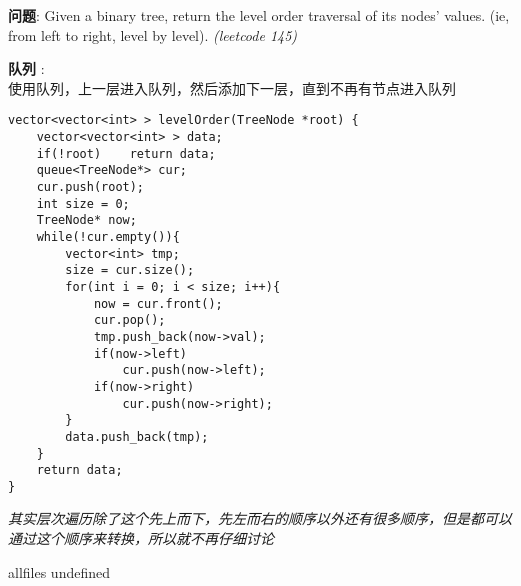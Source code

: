 \documentclass{article}
\begin{document}
\begin{CJK}{UTF8}{gbsn}     %

\else
    
\begin{description}
    \item{\textbf{问题}}: Given a binary tree, return the level order traversal of its nodes' values. (ie, from left to right, level by level). \textit{(leetcode 145)}
    \item{\textbf{队列}} : 
    \\使用队列，上一层进入队列，然后添加下一层，直到不再有节点进入队列
    \begin{lstlisting}
vector<vector<int> > levelOrder(TreeNode *root) {
    vector<vector<int> > data;
    if(!root)    return data;
    queue<TreeNode*> cur;
    cur.push(root);
    int size = 0;
    TreeNode* now;
    while(!cur.empty()){
        vector<int> tmp;
        size = cur.size();
        for(int i = 0; i < size; i++){
            now = cur.front();
            cur.pop();
            tmp.push_back(now->val);
            if(now->left)
                cur.push(now->left);
            if(now->right)
                cur.push(now->right);
        }
        data.push_back(tmp);
    }
    return data;
}
    \end{lstlisting}
    \textit{其实层次遍历除了这个先上而下，先左而右的顺序以外还有很多顺序，但是都可以通过这个顺序来转换，所以就不再仔细讨论}
\end{description}

\fi

\ifx allfiles undefined
\end{CJK}
\end{document}
